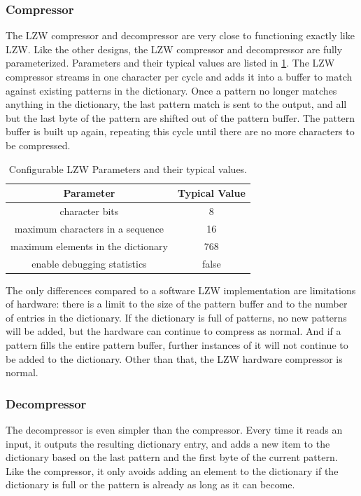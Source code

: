 \documentclass[doublespace,nopageskip]{VTthesis}
\begin{document}
\subsubsection{Compressor}\label{sss:lzw_compressor_design}
The LZW compressor and decompressor are very close to functioning exactly like LZW. Like the other designs, the LZW compressor and decompressor are fully parameterized. Parameters and their typical values are listed in \ref{tab:lzw-configuration-table}. The LZW compressor streams in one character per cycle and adds it into a buffer to match against existing patterns in the dictionary. Once a pattern no longer matches anything in the dictionary, the last pattern match is sent to the output, and all but the last byte of the pattern are shifted out of the pattern buffer. The pattern buffer is built up again, repeating this cycle until there are no more characters to be compressed.

\begin{table}[htb]
	\centering
	\caption{Configurable LZW Parameters and their typical values.}
	\begin{tabular}{cc}
	    \toprule
	    Parameter & Typical Value \\
	    \midrule
	    character bits & 8 \\
	    \midrule
	    maximum characters in a sequence & 16 \\
	    \midrule
	    maximum elements in the dictionary & 768 \\ 
	    \midrule
	    enable debugging statistics & false \\
	    \bottomrule
	\end{tabular}
	\label{tab:lzw-configuration-table}
\end{table}

The only differences compared to a software LZW implementation are limitations of hardware: there is a limit to the size of the pattern buffer and to the number of entries in the dictionary. If the dictionary is full of patterns, no new patterns will be added, but the hardware can continue to compress as normal. And if a pattern fills the entire pattern buffer, further instances of it will not continue to be added to the dictionary. Other than that, the LZW hardware compressor is normal.

\subsubsection{Decompressor}\label{sss:lzw_decompressor_design}
The decompressor is even simpler than the compressor. Every time it reads an input, it outputs the resulting dictionary entry, and adds a new item to the dictionary based on the last pattern and the first byte of the current pattern. Like the compressor, it only avoids adding an element to the dictionary if the dictionary is full or the pattern is already as long as it can become.
\end{document}
